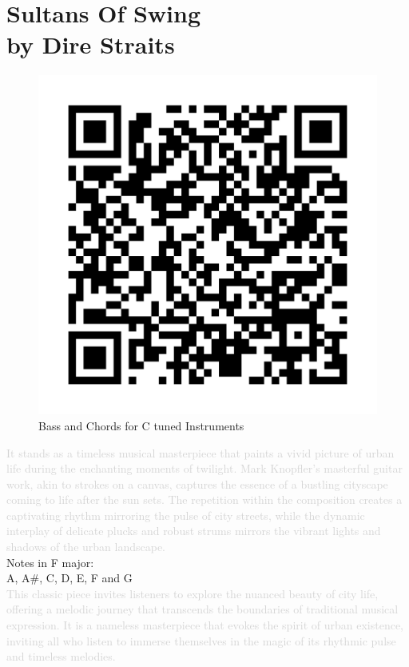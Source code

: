 \chapter[Sultans Of Swing]{Sultans Of Swing\\[1ex]\large{by Dire Straits}}

\begin{figure}
\includegraphics[width=1\linewidth]{QR_Codes/QR_SultansOfSwing_BassChords.png}\\
Bass and Chords for C tuned Instruments
\end{figure}

\textcolor{lightgray}{It stands as a timeless musical masterpiece that paints a vivid picture of urban life during the enchanting moments of twilight. Mark Knopfler's masterful guitar work, akin to strokes on a canvas, captures the essence of a bustling cityscape coming to life after the sun sets. The repetition within the composition creates a captivating rhythm mirroring the pulse of city streets, while the dynamic interplay of delicate plucks and robust strums mirrors the vibrant lights and shadows of the urban landscape.}\\
Notes in F major:\\
A, A\#, C, D, E, F and G\\
\textcolor{lightgray}{This classic piece invites listeners to explore the nuanced beauty of city life, offering a melodic journey that transcends the boundaries of traditional musical expression. It is a nameless masterpiece that evokes the spirit of urban existence, inviting all who listen to immerse themselves in the magic of its rhythmic pulse and timeless melodies.}\\

